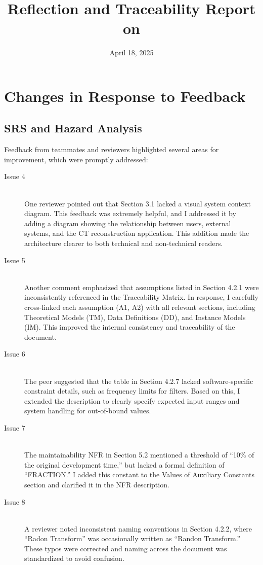 \documentclass{article}
\title{Reflection and Traceability Report on \progname}
\author{\authname}
\date{April 18, 2025}
\begin{document}
\maketitle

\section{Changes in Response to Feedback}
\subsection{SRS and Hazard Analysis}
Feedback from teammates and reviewers highlighted several areas for improvement,
which were promptly addressed:

\begin{description}
\item[Issue 4] \hfill \\
  One reviewer pointed out that Section 3.1 lacked a visual system context
  diagram. This feedback was extremely helpful, and I addressed it by adding a
  diagram showing the relationship between users, external systems, and the CT
  reconstruction application. This addition made the architecture clearer to
  both technical and non-technical readers.
\item[Issue 5] \hfill \\
  Another comment emphasized that assumptions listed in Section 4.2.1 were
  inconsistently referenced in the Traceability Matrix. In response, I carefully
  cross-linked each assumption (A1, A2) with all relevant sections, including
  Theoretical Models (TM), Data Definitions (DD), and Instance Models (IM). This
  improved the internal consistency and traceability of the document.
\item[Issue 6] \hfill \\
  The peer suggested that the table in Section 4.2.7 lacked software-specific
  constraint details, such as frequency limits for filters. Based on this, I
  extended the description to clearly specify expected input ranges and system
  handling for out-of-bound values.
\item[Issue 7] \hfill \\
  The maintainability NFR in Section 5.2 mentioned a threshold of “10\% of the
  original development time,” but lacked a formal definition of “FRACTION.” I
  added this constant to the Values of Auxiliary Constants section and clarified
  it in the NFR description.
\item[Issue 8] \hfill \\
  A reviewer noted inconsistent naming conventions in Section 4.2.2, where
  “Radon Transform” was occasionally written as “Randon Transform.” These typos
  were corrected and naming across the document was standardized to avoid
  confusion.
\end{description}
\end{document}
